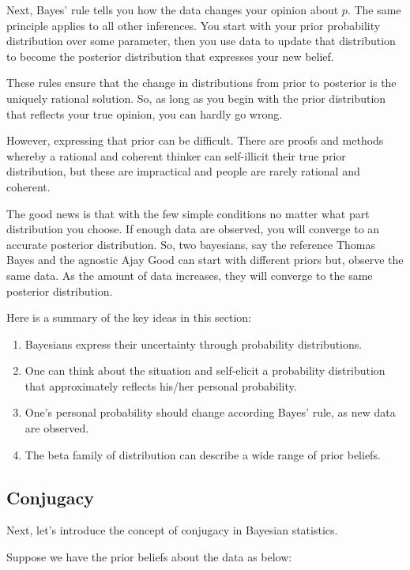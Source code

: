\documentclass[]{book}
\theoremstyle{definition}
\theoremstyle{definition}
\theoremstyle{definition}
\theoremstyle{remark}
\begin{document}
Next, Bayes' rule tells you how the data changes your opinion about
\(p\). The same principle applies to all other inferences. You start
with your prior probability distribution over some parameter, then you
use data to update that distribution to become the posterior
distribution that expresses your new belief.

These rules ensure that the change in distributions from prior to
posterior is the uniquely rational solution. So, as long as you begin
with the prior distribution that reflects your true opinion, you can
hardly go wrong.

However, expressing that prior can be difficult. There are proofs and
methods whereby a rational and coherent thinker can self-illicit their
true prior distribution, but these are impractical and people are rarely
rational and coherent.

The good news is that with the few simple conditions no matter what part
distribution you choose. If enough data are observed, you will converge
to an accurate posterior distribution. So, two bayesians, say the
reference Thomas Bayes and the agnostic Ajay Good can start with
different priors but, observe the same data. As the amount of data
increases, they will converge to the same posterior distribution.

Here is a summary of the key ideas in this section:

\begin{enumerate}
\def\labelenumi{\arabic{enumi}.}
\item
  Bayesians express their uncertainty through probability distributions.
\item
  One can think about the situation and self-elicit a probability
  distribution that approximately reflects his/her personal probability.
\item
  One's personal probability should change according Bayes' rule, as new
  data are observed.
\item
  The beta family of distribution can describe a wide range of prior
  beliefs.
\end{enumerate}

\subsection{Conjugacy}\label{conjugacy}

Next, let's introduce the concept of conjugacy in Bayesian statistics.

Suppose we have the prior beliefs about the data as below:
\end{document}
